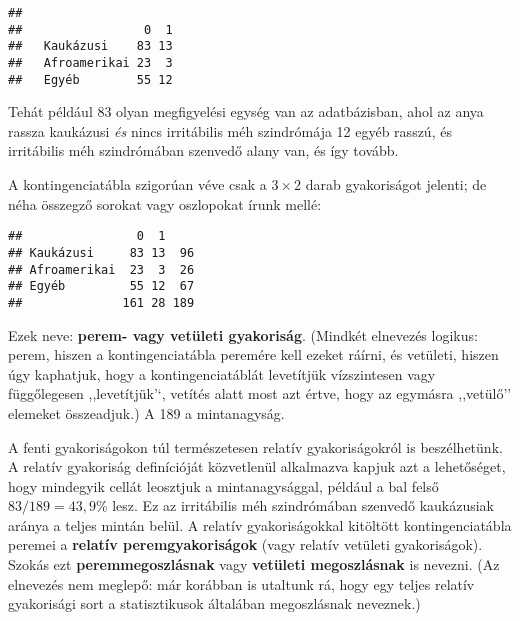 \documentclass[
]{book}
\newenvironment{Shaded}{\begin{snugshade}}{\end{snugshade}}
\newcommand{\DecValTok}[1]{\textcolor[rgb]{0.00,0.00,0.81}{#1}}
\newcommand{\FunctionTok}[1]{\textcolor[rgb]{0.00,0.00,0.00}{#1}}
\newcommand{\NormalTok}[1]{#1}
\newcommand{\OtherTok}[1]{\textcolor[rgb]{0.56,0.35,0.01}{#1}}
\newcommand{\SpecialCharTok}[1]{\textcolor[rgb]{0.00,0.00,0.00}{#1}}
\begin{document}
\begin{Shaded}
\end{Shaded}

\begin{verbatim}
##               
##                 0  1
##   Kaukázusi    83 13
##   Afroamerikai 23  3
##   Egyéb        55 12
\end{verbatim}

Tehát például 83 olyan megfigyelési egység van az adatbázisban, ahol az anya rassza kaukázusi \emph{és} nincs irritábilis méh szindrómája 12 egyéb rasszú, és irritábilis méh szindrómában szenvedő alany van, és így tovább.

A kontingenciatábla szigorúan véve csak a \(3 \times 2\) darab gyakoriságot jelenti; de néha összegző sorokat vagy oszlopokat írunk mellé:

\begin{Shaded}
\end{Shaded}

\begin{verbatim}
##                0  1    
## Kaukázusi     83 13  96
## Afroamerikai  23  3  26
## Egyéb         55 12  67
##              161 28 189
\end{verbatim}

Ezek neve: \textbf{perem- vagy vetületi gyakoriság}. (Mindkét elnevezés logikus: perem, hiszen a kontingenciatábla peremére kell ezeket ráírni, és vetületi, hiszen úgy kaphatjuk, hogy a kontingenciatáblát levetítjük vízszintesen vagy függőlegesen ,,levetítjük'`, vetítés alatt most azt értve, hogy az egymásra ,,vetülő'' elemeket összeadjuk.) A 189 a mintanagyság.

A fenti gyakoriságokon túl természetesen relatív gyakoriságokról is beszélhetünk. A relatív gyakoriság definícióját közvetlenül alkalmazva kapjuk azt a lehetőséget, hogy mindegyik cellát leosztjuk a mintanagysággal, például a bal felső \(83/189=43,\!9\)\% lesz. Ez az irritábilis méh szindrómában szenvedő kaukázusiak aránya a teljes mintán belül. A relatív gyakoriságokkal kitöltött kontingenciatábla peremei a \textbf{relatív peremgyakoriságok} (vagy relatív vetületi gyakoriságok). Szokás ezt \textbf{peremmegoszlásnak} vagy \textbf{vetületi megoszlásnak} is nevezni. (Az elnevezés nem meglepő: már korábban is utaltunk rá, hogy egy teljes relatív gyakorisági sort a statisztikusok általában megoszlásnak neveznek.)
\end{document}
